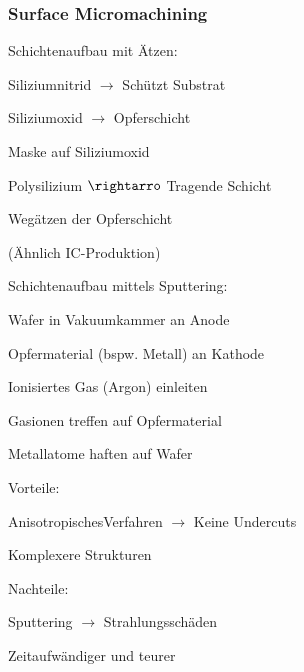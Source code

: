 \subsubsection{Surface Micromachining}
	\begin{minipage}{0.4\textwidth}
      \begin{compactitem}
        \item Schichtenaufbau mit Ätzen:
        \begin{compactitem}
            \item Siliziumnitrid $\rightarrow$ Schützt Substrat
            \item Siliziumoxid $\rightarrow$ Opferschicht
            \item Maske auf Siliziumoxid
            \item Polysilizium  $\rightarro$ Tragende Schicht
            \item Wegätzen der Opferschicht
            \item (Ähnlich IC-Produktion)
        \end{compactitem}
      \end{compactitem}

	  \begin{compactitem}
	    \item Schichtenaufbau mittels Sputtering:
        \begin{compactitem}
            \item Wafer in Vakuumkammer an Anode
            \item Opfermaterial (bspw. Metall) an Kathode
            \item Ionisiertes Gas (Argon) einleiten
            \item Gasionen treffen auf Opfermaterial
            \item Metallatome haften auf Wafer
        \end{compactitem}
      \end{compactitem}  
      \begin{compactitem}
        \item Vorteile:
        \begin{compactitem}
          \item AnisotropischesVerfahren $\rightarrow$ Keine Undercuts
          \item Komplexere Strukturen
        \end{compactitem}
        \item Nachteile:
          \begin{compactitem}
            \item Sputtering $\rightarrow$ Strahlungsschäden
            \item Zeitaufwändiger und teurer
          \end{compactitem}
      \end{compactitem}
    \end{minipage}
